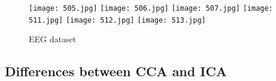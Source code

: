 \begin{figure}[!htbp]
%
\centering
\texttt{[image: 505.jpg]}
\label{BSS1}
\texttt{[image: 506.jpg]}
\label{HIST1}
\texttt{[image: 507.jpg]}
\label{HIST3}
\endminipage\hfill
{}%
\centering
\texttt{[image: 511.jpg]}
\label{BSS2}
\texttt{[image: 512.jpg]}
\label{HIST2}
\texttt{[image: 513.jpg]}
\label{HIST4}
\endminipage\hfill
\caption{EEG dataset}
\end{figure}



\newpage
\subsection{Differences between CCA and ICA}


